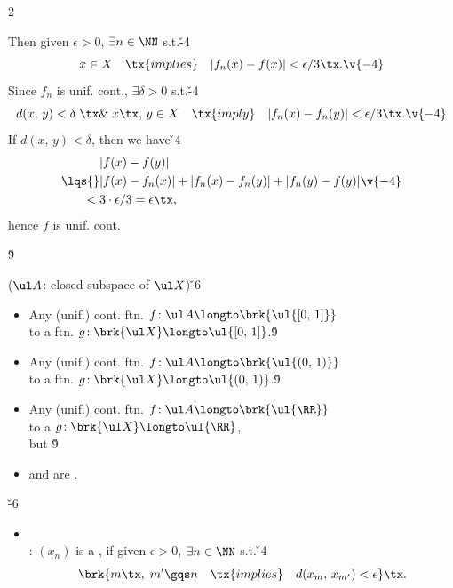\documentclass[dvipdfmx,a4paper,titlepage,9pt]{jsarticle}
\begin{document}
\begin{multicols*}{2}
\begin{itemize}[label=-]
\begin{Pfbox}[(unif.)]
Then given $\epsilon>0$, $\exists n\in\NN$ s.t.\v{-4}
$$x\in X\quad\tx{implies}\quad |f_n(x)-f(x)|<\epsilon/3\tx.\v{-4}$$
Since $f_n$ is unif. cont., $\exists\delta>0$ s.t.\v{-4}
$$d(x,\,y)<\delta\;\tx\&\; x\tx,\,y\in X\quad\tx{imply}\quad |f_n(x)-f_n(y)|<\epsilon/3\tx.\v{-4}$$
If $d(x,\,y)<\delta$, then we have\v{-4}
$$\begin{aligned}
&|f(x)-f(y)|\\
\lqs{}&|f(x)-f_n(x)|+|f_n(x)-f_n(y)|+|f_n(y)-f(y)|\\
<{}&3\cdot \epsilon/3=\epsilon\tx,
\end{aligned}\v{-4}$$
hence $f$ is unif. cont.
\end{Pfbox}
\end{itemize}\v9

 ($\ul A$: closed subspace of $\ul X$)\v{-6}
\begin{itemize}[label=-]
\item Any (unif.) cont. ftn. $f\!:\ul A\longto\brk{\ul{[0,\,1]}}$\\
 to a  ftn. $g\!:\brk{\ul X}\longto\ul{[0,\,1]}$.\v9

\item Any (unif.) cont. ftn. $f\!:\ul A\longto\brk{\ul{(0,\,1)}}$\\
 to a  ftn. $g\!:\brk{\ul X}\longto\ul{(0,\,1)}$.\v9

\item Any (unif.) cont. ftn. $f\!:\ul A\longto\brk{\ul{\RR}}$\\
 to a  $g\!:\brk{\ul X}\longto\ul{\RR}$,\\
but \v9

\item {} and \brk{$\ul\RR$} are .
\end{itemize}

\newpage


\v{-6}
\begin{itemize}[label=-]
\item{}\\
: $(x_n)$ is a , if given $\epsilon>0$, $\exists n\in\NN$ s.t.\v{-4}
$$\brk{m\tx,\;m'\gqs n\quad\tx{implies}\quad d(x_m,\,x_{m'})<\epsilon}\tx.$$


\end{itemize}
\end{multicols*}
\end{document}
